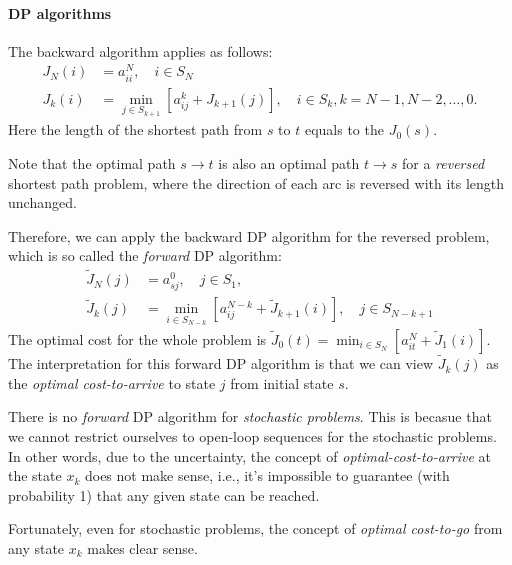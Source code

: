 \paragraph{DP algorithms}
The backward algorithm applies as follows:
\begin{align*}
J_N(i)&=a_{ii}^N,\quad i\in S_N\\
J_k(i)&=\min_{j\in S_{k+1}}[a_{ij}^k + J_{k+1}(j)],\quad i\in S_k, k = N-1,N-2,\dots,0.
\end{align*}
Here the length of the shortest path from $s$ to $t$ equals to the $J_0(s)$. 

Note that the optimal path $s\to t$ is also an optimal path $t\to s$ for a \emph{reversed} shortest path problem, where the direction of each arc is reversed with its length unchanged.

Therefore, we can apply the backward DP algorithm for the reversed problem, which is so called the \emph{forward} DP algorithm:
\begin{align*}
\tilde{J}_N(j) &=a_{sj}^0,\quad j\in S_1,\\
\tilde{J}_k(j) &=\min_{i\in S_{N-k}}\left[
a_{ij}^{N-k} + \tilde{J}_{k+1}(i)
\right],\quad j\in S_{N-k+1}
\end{align*}
The optimal cost for the whole problem is $\tilde{J}_0(t) = \min_{i\in S_N}\left[a_{it}^N+\tilde{J}_1(i)\right]$.
The interpretation for this forward DP algorithm is that we can view $\tilde{J}_k(j)$ as the \emph{optimal cost-to-arrive} to state $j$ from initial state $s$.
\begin{remark}
There is no \emph{forward} DP algorithm for \emph{stochastic problems}.
This is becasue that we cannot restrict ourselves to open-loop sequences for the stochastic problems.
In other words, due to the uncertainty, the concept of \emph{optimal-cost-to-arrive} at the state $x_k$ does not make sense, i.e., it's impossible to guarantee (with probability 1) that any given state can be reached.

Fortunately, even for stochastic problems, the concept of \emph{optimal cost-to-go} from any state $x_k$ makes clear sense.
\end{remark}

